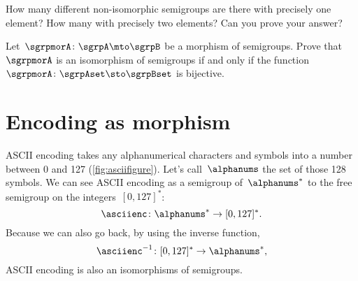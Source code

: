 
\begin{gradedexercise}
	\label{ex:non-isomorphic}
	How many different non-isomorphic semigroups are there with precisely one element?
	How many with precisely two elements?
	Can you prove your answer?
\end{gradedexercise}

\begin{gradedexercise}
	\label{ex:CharacterizeSemigroupIsos}
	\label{ex:semi-morph}
	Let~$\sgrpmorA\colon \sgrpA \mto \sgrpB$ be a morphism of semigroups.
	Prove that~$\sgrpmorA$ is an isomorphism of semigroups if and only if the function~$\sgrpmorA \colon \sgrpAset \sto \sgrpBset$ is bijective.
\end{gradedexercise}

\section{Encoding as morphism }

\begin{example}
	ASCII encoding takes any alphanumerical characters and symbols into a number between 0 and 127 (\cref{fig:asciifigure}).
	Let's call~$\alphanums$ the set of those 128 symbols.
	We can see ASCII encoding as a semigroup \whomo of~$\alphanums^*$ to the free semigroup on the integers~$[0,127]^*$:
	\begin{equation*}
		\label{eq:ASCII-semi}
		\asciienc\colon \alphanums^* \to  [0,127]^*.
	\end{equation*}
	Because we can also go back, by using the inverse function,
	\begin{equation*}
		\label{eq:ASCII-semi-inv}
		\asciienc^{-1}\colon  [0,127]^*  \to  \alphanums^*,
	\end{equation*}
	ASCII encoding is also an isomorphisms of semigroups.
\end{example}

